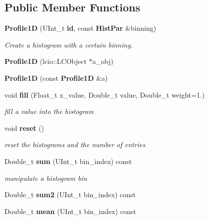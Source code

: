 \subsection*{Public Member Functions}
\begin{DoxyCompactItemize}
\item 
{\bf Profile1\-D} (U\-Int\-\_\-t {\bf id}, const {\bf Hist\-Par} \&binning)
\begin{DoxyCompactList}\small\item\em Create a histogram with a certain binning. \end{DoxyCompactList}\item 
{\bfseries Profile1\-D} (lcio\-::\-L\-C\-Object $\ast$a\-\_\-obj)\label{classhistmgr_1_1Profile1D_a4789d7e34227713903e379a1ec7d3962}

\item 
{\bfseries Profile1\-D} (const {\bf Profile1\-D} \&a)\label{classhistmgr_1_1Profile1D_a7a6d403d74f7d436a5cbb68016580511}

\item 
void {\bf fill} (Float\-\_\-t x\-\_\-value, Double\-\_\-t value, Double\-\_\-t weight=1.)\label{classhistmgr_1_1Profile1D_a85d6672aca865b96e557323d3095b94c}

\begin{DoxyCompactList}\small\item\em fill a value into the histogram \end{DoxyCompactList}\item 
void {\bf reset} ()\label{classhistmgr_1_1Profile1D_a0aff38e965618142af8ecda50b721d4f}

\begin{DoxyCompactList}\small\item\em reset the histograms and the number of entries \end{DoxyCompactList}\item 
Double\-\_\-t {\bf sum} (U\-Int\-\_\-t bin\-\_\-index) const 
\begin{DoxyCompactList}\small\item\em manipulate a histogram bin \end{DoxyCompactList}\item 
Double\-\_\-t {\bfseries sum2} (U\-Int\-\_\-t bin\-\_\-index) const \label{classhistmgr_1_1Profile1D_a27a5f854b0de6cd760a1be589a9165ef}

\item 
Double\-\_\-t {\bfseries mean} (U\-Int\-\_\-t bin\-\_\-index) const \label{classhistmgr_1_1Profile1D_a3aabceab2ad741e243aedea0bb3598d7}


\end{DoxyCompactItemize}
